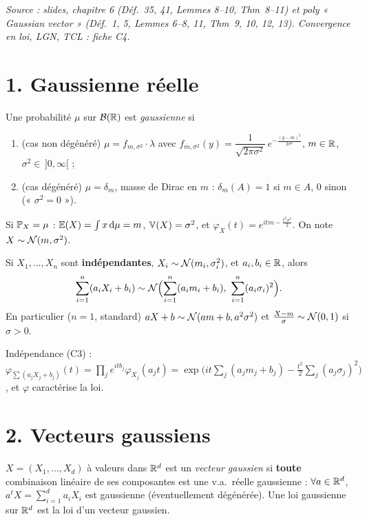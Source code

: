 \documentclass[11pt,a4paper]{article}
\begin{document}

\textit{Source : slides, chapitre 6 (Déf.~35, 41, Lemmes 8--10, Thm~8--11) et poly « Gaussian vector » (Déf.~1, 5, Lemmes 6--8, 11,
Thm~9, 10, 12, 13). Convergence en loi, LGN, TCL : fiche C4.}

\section*{1. Gaussienne réelle}

\begin{definition}\label{C5:gauss1}
Une probabilité $\mu$ sur $\mathcal{B}(\mathbb{R})$ est \emph{gaussienne} si
\begin{enumerate}
  \item (cas non dégénéré) $\mu=f_{m,\sigma^2}\cdot\lambda$ avec
  $f_{m,\sigma^2}(y)=\dfrac{1}{\sqrt{2\pi\sigma^2}}\,e^{-\frac{(y-m)^2}{2\sigma^2}}$, $m\in\mathbb{R}$, $\sigma^2\in\,]0,\infty[$ ;
  \item (cas dégénéré) $\mu=\delta_m$, masse de Dirac en $m$ : $\delta_m(A)=1$ si $m\in A$, $0$ sinon (« $\sigma^2=0$ »).
\end{enumerate}
Si $\mathbb{P}_X=\mu$ : $\mathbb{E}(X)=\int x\,\mathrm{d}\mu=m$, $\operatorname{\mathbb{V}}(X)=\sigma^2$, et $\varphi_X(t)=e^{itm-\frac{t^2\sigma^2}{2}}$. On note $X\sim\mathcal{N}(m,\sigma^2)$.
\end{definition}

\begin{proposition}\label{C5:somme-indep}
Si $X_1,\dots,X_n$ sont \textbf{indépendantes}, $X_i\sim\mathcal{N}(m_i,\sigma_i^2)$, et $a_i,b_i\in\mathbb{R}$, alors
\[\sum_{i=1}^n(a_iX_i+b_i)\sim\Nc\Bigl(\sum_{i=1}^n(a_im_i+b_i),\ \sum_{i=1}^n(a_i\sigma_i)^2\Bigr).\]
En particulier ($n=1$, standard) $aX+b\sim\mathcal{N}(am+b,a^2\sigma^2)$ et $\frac{X-m}{\sigma}\sim\mathcal{N}(0,1)$ si $\sigma>0$.
\end{proposition}
\begin{idee}
Indépendance (C3) : $\varphi_{\sum(a_jX_j+b_j)}(t)=\prod_je^{itb_j}\varphi_{X_j}(a_jt)
=\exp\bigl(it\sum_j(a_jm_j+b_j)-\frac{t^2}2\sum_j(a_j\sigma_j)^2\bigr)$, et $\varphi$ caractérise la loi.
\end{idee}

\section*{2. Vecteurs gaussiens}

\begin{definition}\label{C5:vecteur}
$X=(X_1,\dots,X_d)$ à valeurs dans $\mathbb{R}^d$ est un \emph{vecteur gaussien} si \textbf{toute} combinaison linéaire de ses
composantes est une v.a.\ réelle gaussienne : $\forall a\in\mathbb{R}^d$, $a^tX=\sum_{i=1}^da_iX_i$ est gaussienne (éventuellement dégénérée).
Une loi gaussienne sur $\mathbb{R}^d$ est la loi d'un vecteur gaussien.
\end{definition}
\end{document}
